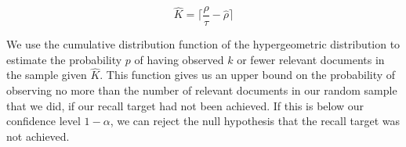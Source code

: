\documentclass{bmcart}
\begin{document}
	\begin{equation}
		\hat{K} = \lceil \frac{\rho}{\tau} - \hat{\rho} \rceil
	\end{equation}
	
	We use the cumulative distribution function of the hypergeometric distribution to estimate the probability $p$ of having observed $k$ or fewer relevant documents in the sample given $\hat{K}$. This function gives us an upper bound on the probability of observing no more than the number of relevant documents in our random sample that we did, if our recall target had not been achieved.
	If this is below our confidence level $1 - \alpha$, we can reject the null hypothesis that the recall target was not achieved.
	
	
	
	
%	
%
%
%
%	
%	
\end{document}
